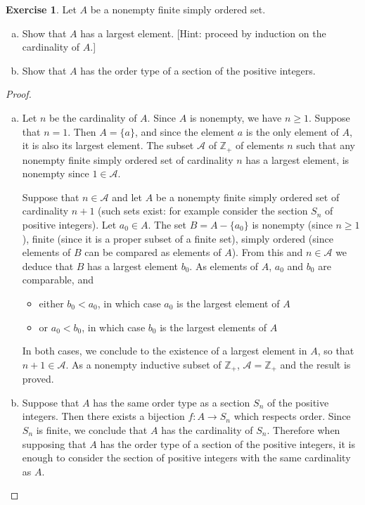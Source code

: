\documentclass[11pt,a4paper,twoside]{article}
\theoremstyle{definition}
\newcounter{excounter}
\newtheorem{exercise}[excounter]{Exercise}
\begin{document}
\begin{exercise}

  Let $A$ be a nonempty finite simply ordered set.
  \begin{enumerate}[(a)]
  \item Show that $A$ has a largest element. [Hint: proceed by induction on the cardinality of $A$.]
  \item Show that $A$ has the order type of a section of the positive integers.
  \end{enumerate}

\end{exercise}

\begin{proof}\hfill

  \begin{enumerate}[(a)]

  \item Let $n$ be the cardinality of $A$. Since $A$ is nonempty, we have $n \geq 1$.
    Suppose that $n = 1$. Then $A = \{ a \}$, and since the element $a$ is the only element of $A$, it is also its largest element.
    The subset $\mathscr{A}$ of $\mathbb{Z}_+$ of elements $n$ such that any nonempty finite simply ordered set of cardinality $n$ has a largest element,
    is nonempty since $1 \in \mathscr{A}$.

    Suppose that $n \in \mathscr{A}$ and let $A$ be a nonempty finite simply ordered set of cardinality $n + 1$
    (such sets exist: for example consider the section $S_n$ of positive integers).
    Let $a_0 \in A$. The set $B = A - \{ a_0 \}$ is nonempty (since $n \geq 1$), finite (since it is a proper subset of a finite set),
    simply ordered (since elements of $B$ can be compared as elements of $A$). From this and $n \in \mathscr{A}$ we deduce that $B$ has a largest element $b_0$.
    As elements of $A$, $a_0$ and $b_0$ are comparable, and
    \begin{itemize}
    \item either $b_0 < a_0$, in which case $a_0$ is the largest element of $A$
    \item or $a_0 < b_0$, in which case $b_0$ is the largest elements of $A$
    \end{itemize}
    In both cases, we conclude to the existence of a largest element in $A$, so that $n + 1 \in \mathscr{A}$.
    As a nonempty inductive subset of $\mathbb{Z}_+$,  $\mathscr{A} = \mathbb{Z}_+$ and the result is proved.

  \item Suppose that $A$ has the same order type as a section $S_n$ of the positive integers.
    Then there exists a bijection $f : A \to S_n$ which respects order. Since $S_n$ is finite, we conclude that
    $A$ has the cardinality of $S_n$. Therefore when supposing that $A$ has the order type of a section of the positive integers,
    it is enough to consider the section of positive integers with the same cardinality as $A$.


\end{enumerate}
\end{proof}
\end{document}

